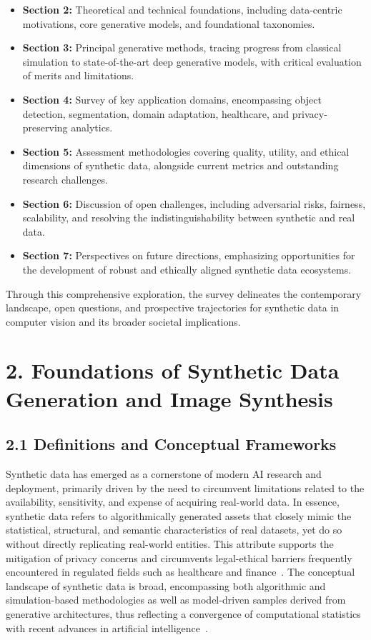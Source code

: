 \documentclass[11pt]{article}
\begin{document}
\begin{itemize}
    \item \textbf{Section 2:} Theoretical and technical foundations, including data-centric motivations, core generative models, and foundational taxonomies.
    \item \textbf{Section 3:} Principal generative methods, tracing progress from classical simulation to state-of-the-art deep generative models, with critical evaluation of merits and limitations.
    \item \textbf{Section 4:} Survey of key application domains, encompassing object detection, segmentation, domain adaptation, healthcare, and privacy-preserving analytics.
    \item \textbf{Section 5:} Assessment methodologies covering quality, utility, and ethical dimensions of synthetic data, alongside current metrics and outstanding research challenges.
    \item \textbf{Section 6:} Discussion of open challenges, including adversarial risks, fairness, scalability, and resolving the indistinguishability between synthetic and real data.
    \item \textbf{Section 7:} Perspectives on future directions, emphasizing opportunities for the development of robust and ethically aligned synthetic data ecosystems.
\end{itemize}

Through this comprehensive exploration, the survey delineates the contemporary landscape, open questions, and prospective trajectories for synthetic data in computer vision and its broader societal implications.

\section{2. Foundations of Synthetic Data Generation and Image Synthesis}

\subsection{2.1 Definitions and Conceptual Frameworks}

Synthetic data has emerged as a cornerstone of modern AI research and deployment, primarily driven by the need to circumvent limitations related to the availability, sensitivity, and expense of acquiring real-world data. In essence, synthetic data refers to algorithmically generated assets that closely mimic the statistical, structural, and semantic characteristics of real datasets, yet do so without directly replicating real-world entities. This attribute supports the mitigation of privacy concerns and circumvents legal-ethical barriers frequently encountered in regulated fields such as healthcare and finance~\cite{87}. The conceptual landscape of synthetic data is broad, encompassing both algorithmic and simulation-based methodologies as well as model-driven samples derived from generative architectures, thus reflecting a convergence of computational statistics with recent advances in artificial intelligence~\cite{1,13,64,87}.
\end{document}
